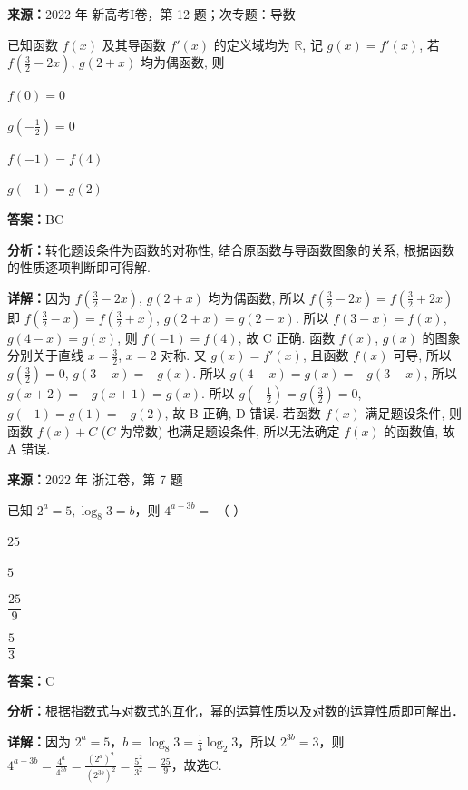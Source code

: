 \begin{question}[points=5]
\textbf{来源：}2022 年 新高考I卷，第 12 题；次专题：导数\par
已知函数 $f(x)$ 及其导函数 $f'(x)$ 的定义域均为 $\mathbb{R}$, 记 $g(x) = f'(x)$, 若 $f\left(\frac{3}{2} - 2x\right)$, $g(2 + x)$ 均为偶函数, 则
\begin{choices}
  \item $f(0) = 0$
  \item $g\left(-\frac{1}{2}\right) = 0$
  \item $f(-1) = f(4)$
  \item $g(-1) = g(2)$
\end{choices}
\begin{solution}
\textbf{答案：}BC

\textbf{分析：}转化题设条件为函数的对称性, 结合原函数与导函数图象的关系, 根据函数的性质逐项判断即可得解.

\textbf{详解：}因为 $f\left(\frac{3}{2} - 2x\right)$, $g(2 + x)$ 均为偶函数, 所以 $f\left(\frac{3}{2} - 2x\right) = f\left(\frac{3}{2} + 2x\right)$ 即 $f\left(\frac{3}{2} - x\right) = f\left(\frac{3}{2} + x\right)$, $g(2 + x) = g(2 - x)$. 所以 $f(3 - x) = f(x)$, $g(4 - x) = g(x)$, 则 $f(-1) = f(4)$, 故 C 正确. 函数 $f(x)$, $g(x)$ 的图象分别关于直线 $x = \frac{3}{2}$, $x = 2$ 对称. 又 $g(x) = f'(x)$, 且函数 $f(x)$ 可导, 所以 $g\left(\frac{3}{2}\right) = 0$, $g(3 - x) = -g(x)$. 所以 $g(4 - x) = g(x) = -g(3 - x)$, 所以 $g(x + 2) = -g(x + 1) = g(x)$. 所以 $g\left(-\frac{1}{2}\right) = g\left(\frac{3}{2}\right) = 0$, $g(-1) = g(1) = -g(2)$, 故 B 正确, D 错误. 若函数 $f(x)$ 满足题设条件, 则函数 $f(x) + C$ ($C$ 为常数) 也满足题设条件, 所以无法确定 $f(x)$ 的函数值, 故 A 错误.
\end{solution}
\end{question}

\begin{question}[points=4]
\textbf{来源：}2022 年 浙江卷，第 7 题\par
已知 $2^a = 5, \log_8 3 = b$，则 $4^{a-3b} =$ （ ）
\begin{choices}
  \item $25$
  \item $5$
  \item $\dfrac{25}{9}$
  \item $\dfrac{5}{3}$
\end{choices}
\begin{solution}
\textbf{答案：}C

\textbf{分析：}根据指数式与对数式的互化，幂的运算性质以及对数的运算性质即可解出．

\textbf{详解：}因为 $2^a = 5$，$b = \log_8 3 = \frac{1}{3} \log_2 3$，所以 $2^{3b} = 3$，则 $4^{a-3b} = \frac{4^a}{4^{3b}} = \frac{(2^a)^2}{(2^{3b})^2} = \frac{5^2}{3^2} = \frac{25}{9}$，故选C.
\end{solution}
\end{question}

